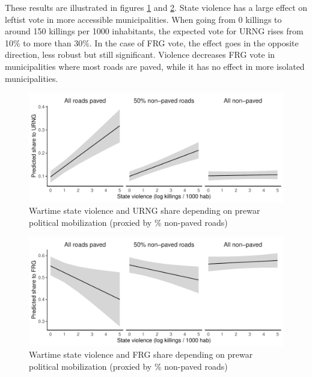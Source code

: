\documentclass[12pt, notitlepage]{article}
\begin{document}


These results are illustrated in figures \ref{fig:pp_URNG_roads} and \ref{fig:pp_FRG_roads}.
State violence has a large effect on leftist vote in more accessible municipalities.
When going from 0 killings to around 150 killings per 1000 inhabitants, the expected vote for URNG rises from 10\% to more than 30\%.
In the case of FRG vote, the effect goes in the opposite direction, less robust but still significant.
Violence decreases FRG vote in municipalities where most roads are paved, while it has no effect in more isolated municipalities.

\begin{figure}[htb!]
  \centering
    \includegraphics[width = .75\textwidth]{img/pp_URNG_roads}

  \caption{Wartime state violence and URNG share depending on prewar political mobilization (proxied by \% non-paved roads)} \label{fig:pp_URNG_roads}


\end{figure}

\begin{figure}[htb!]
  \centering
    \includegraphics[width = .75\textwidth]{img/pp_FRG_roads}

  \caption{Wartime state violence and FRG share depending on prewar political mobilization (proxied by \% non-paved roads)} \label{fig:pp_FRG_roads}


\end{figure}
\end{document}
